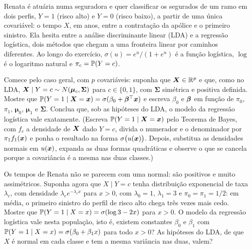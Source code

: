 Renata é atuária numa seguradora e quer classificar os segurados de um ramo em dois
perfis, $Y=1$ (risco alto) e $Y=0$ (risco baixo), a partir de uma única covariável: o
tempo $X$, em anos, entre a contratação da apólice e o primeiro sinistro. Ela hesita
entre a análise discriminante linear (LDA) e a regressão logística, dois métodos que
chegam a uma fronteira linear por caminhos diferentes. Ao longo do exercício,
$\sigma(u)=e^u/(1+e^u)$ é a função logística, $\log$ é o logaritmo natural e
$\pi_c=\mathbb{P}(Y=c)$.
\begin{itens}
  \item {} Comece pelo caso geral, com $p$ covariáveis: suponha que $\bm{X}\in\mathbb{R}^p$ e
        que, como no LDA, $\bm{X}\mid Y=c\sim N(\bm\mu_c,\bm\Sigma)$ para $c\in\{0,1\}$, com
        $\bm\Sigma$ simétrica e positiva definida. Mostre que
        $\mathbb{P}(Y=1\mid\bm{X}=\bm{x})=\sigma(\beta_0+\bm{\beta}^\top\bm{x})$ e escreva $\beta_0$ e
        $\bm{\beta}$ em função de $\pi_0$, $\pi_1$, $\bm\mu_0$, $\bm\mu_1$ e $\bm\Sigma$.
        Conclua que, sob as hipóteses do LDA, o modelo da regressão logística vale
        exatamente. (Escreva $\mathbb{P}(Y=1\mid\bm{X}=\bm{x})$ pelo Teorema de Bayes, com $f_c$ a
        densidade de $\bm{X}$ dado $Y=c$, divida o numerador e o denominador por
        $\pi_1f_1(\bm{x})$ e ponha o resultado na forma $\sigma\big(u(\bm{x})\big)$. Depois,
        substitua as densidades normais em $u(\bm{x})$, expanda as duas formas quadráticas e
        observe o que se cancela porque a covariância é a mesma nas duas classes.)
  \item {} Os tempos de Renata não se parecem com uma normal: são positivos e
        muito assimétricos. Suponha agora que $X\mid Y=c$ tenha distribuição
        exponencial de taxa $\lambda_c$, com densidade $\lambda_c e^{-\lambda_c x}$ para
        $x>0$, com $\lambda_0=1$, $\lambda_1=3$ e $\pi_0=\pi_1=1/2$: em média, o
        primeiro sinistro do perfil de risco alto chega três vezes mais cedo. Mostre que
        $\mathbb{P}(Y=1\mid X=x)=\sigma(\log3-2x)$ para $x>0$. O modelo da regressão
        logística vale nesta população, isto é, existem constantes $\beta_0$ e $\beta_1$
        com $\mathbb{P}(Y=1\mid X=x)=\sigma(\beta_0+\beta_1x)$ para todo $x>0$? As hipóteses do
        LDA, de que $X$ é normal em cada classe e tem a mesma variância nas duas, valem?
\end{itens}

